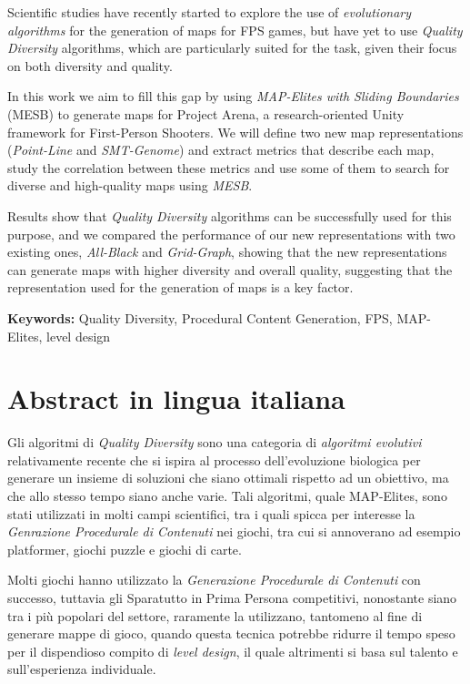 \documentclass{Configuration_Files/PoliMi3i_thesis}
\begin{document}
Scientific studies have recently started to explore the use of \textit{evolutionary algorithms} for the generation of maps for FPS games, but have yet to use \textit{Quality Diversity} algorithms, which are particularly suited for the task, given their focus on both diversity and quality.

In this work we aim to fill this gap by using \textit{MAP-Elites with Sliding Boundaries} (MESB) to generate maps for Project Arena, a research-oriented Unity framework for First-Person Shooters. We will define two new map representations (\textit{Point-Line} and \textit{SMT-Genome}) and extract metrics that describe each map, study the correlation between these metrics and use some of them to search for diverse and high-quality maps using \textit{MESB}.

Results show that \textit{Quality Diversity} algorithms can be successfully used for this purpose, and we compared the performance of our new representations with two existing ones, \textit{All-Black} and \textit{Grid-Graph}, showing that the new representations can generate maps with higher diversity and overall quality, suggesting that the representation used for the generation of maps is a key factor.


\textbf{Keywords:} Quality Diversity, Procedural Content Generation, FPS, MAP-Elites, level design %

\chapter*{Abstract in lingua italiana}
Gli algoritmi di \textit{Quality Diversity} sono una categoria di \textit{algoritmi evolutivi} relativamente recente che si ispira al processo dell'evoluzione biologica per generare un insieme di soluzioni che siano ottimali rispetto ad un obiettivo, ma che allo stesso tempo siano anche varie.
Tali algoritmi, quale MAP-Elites, sono stati utilizzati in molti campi scientifici, tra i quali spicca per interesse la \textit{Genrazione Procedurale di Contenuti} nei giochi, tra cui si annoverano ad esempio platformer, giochi puzzle e giochi di carte.

Molti giochi hanno utilizzato la \textit{Generazione Procedurale di Contenuti} con successo, tuttavia gli Sparatutto in Prima Persona competitivi, nonostante siano tra i più popolari del settore, raramente la utilizzano, tantomeno al fine di generare mappe di gioco, quando questa tecnica potrebbe ridurre il tempo speso per il dispendioso compito di \textit{level design}, il quale altrimenti si basa sul talento e sull'esperienza individuale.
\end{document}
